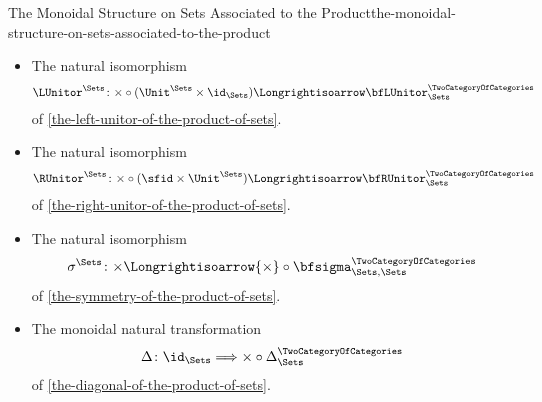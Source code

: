 \begin{proposition}{The Monoidal Structure on Sets Associated to the Product}{the-monoidal-structure-on-sets-associated-to-the-product}
\begin{itemize}
        \item{}The natural isomorphism
            \[
                \LUnitor^{\Sets}%
                \colon%
                {\times}\circ{(\Unit^{\Sets}\times\id_{\Sets})}
                \Longrightisoarrow
                \bfLUnitor^{\TwoCategoryOfCategories}_{\Sets}
            \]%
            of \cref{the-left-unitor-of-the-product-of-sets}.
        \item{}The natural isomorphism
            \[
                \RUnitor^{\Sets}%
                \colon%
                {\times}\circ{({\sfid}\times{\Unit^{\Sets}})}%
                \Longrightisoarrow%
                \bfRUnitor^{\TwoCategoryOfCategories}_{\Sets}%
            \]%
            of \cref{the-right-unitor-of-the-product-of-sets}.
        \item{}The natural isomorphism
            \[
                \sigma^{\Sets}
                \colon
                {\times}
                \Longrightisoarrow
                {\times}\circ{\bfsigma^{\TwoCategoryOfCategories}_{\Sets,\Sets}}
            \]%
            of \cref{the-symmetry-of-the-product-of-sets}.
        \item{}The monoidal natural transformation
            \[
                \Delta%
                \colon%
                \id_{\Sets}%
                \Longrightarrow%
                \times\circ\Delta^{\TwoCategoryOfCategories}_{\Sets}%
            \]%
            of \cref{the-diagonal-of-the-product-of-sets}.
    \end{itemize}
\end{proposition}
